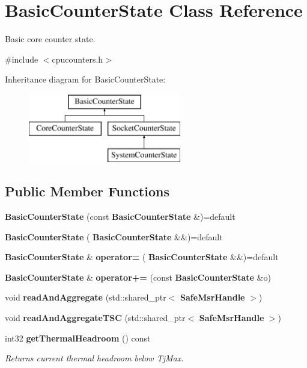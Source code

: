 \section{Basic\+Counter\+State Class Reference}
\label{classBasicCounterState}


Basic core counter state.  




{\ttfamily \#include $<$cpucounters.\+h$>$}

Inheritance diagram for Basic\+Counter\+State\+:\begin{figure}[H]
\begin{center}
\leavevmode
\includegraphics[height=3.000000cm]{classBasicCounterState}
\end{center}
\end{figure}
\subsection*{Public Member Functions}
\begin{DoxyCompactItemize}
\item 
\mbox{\label{classBasicCounterState_a7e7ac4f348561069929ac87bfb170b33}} 
{\bfseries Basic\+Counter\+State} (const \textbf{ Basic\+Counter\+State} \&)=default
\item 
\mbox{\label{classBasicCounterState_a63a6159cbe7d3b07aede35c71691fc83}} 
{\bfseries Basic\+Counter\+State} (\textbf{ Basic\+Counter\+State} \&\&)=default
\item 
\mbox{\label{classBasicCounterState_aecd15f5404ce5254eb60a1e6c8d5fec8}} 
\textbf{ Basic\+Counter\+State} \& {\bfseries operator=} (\textbf{ Basic\+Counter\+State} \&\&)=default
\item 
\mbox{\label{classBasicCounterState_a448f898e8ff78336611db856aa1354db}} 
\textbf{ Basic\+Counter\+State} \& {\bfseries operator+=} (const \textbf{ Basic\+Counter\+State} \&o)
\item 
\mbox{\label{classBasicCounterState_ae40030f6dc67badf91e4084397f998be}} 
void {\bfseries read\+And\+Aggregate} (std\+::shared\+\_\+ptr$<$ \textbf{ Safe\+Msr\+Handle} $>$)
\item 
\mbox{\label{classBasicCounterState_acb3ee2eabe21674e7930b19ef7ab3183}} 
void {\bfseries read\+And\+Aggregate\+T\+SC} (std\+::shared\+\_\+ptr$<$ \textbf{ Safe\+Msr\+Handle} $>$)
\item 
\mbox{\label{classBasicCounterState_a57d93ca07fed611468739280015a3448}} 
int32 \textbf{ get\+Thermal\+Headroom} () const
\begin{DoxyCompactList}\small\item\em Returns current thermal headroom below Tj\+Max. \end{DoxyCompactList}\end{DoxyCompactItemize}
